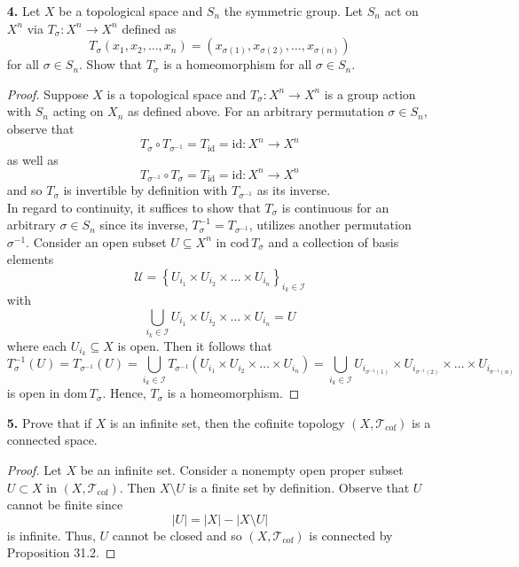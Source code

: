 \documentclass[ 12pt ]{article}
\begin{document}
\begin{enumerate}
	\item[\textbf{4.}] Let $X$ be a topological space and $S_n$ the symmetric group. Let $S_n$ act on $X^n$ via $T_\sigma : X^n \to X^n$ defined as $$T_\sigma(x_1, x_2, \hdots, x_n)
		= (x_{\sigma(1)}, x_{\sigma(2)}, \hdots, x_{\sigma(n)})$$ for all $\sigma \in S_n$. Show that $T_\sigma$ is a homeomorphism for all $\sigma \in S_n$.

		\begin{proof}
			Suppose $X$ is a topological space and $T_\sigma : X^n \to X^n$ is a group action with $S_n$ acting on $X_n$ as defined above. For an arbitrary permutation $\sigma \in S_n$,
			observe that $$T_\sigma \circ T_{\sigma^{-1}} = T_\mathrm{id} = \mathrm{id} : X^n \to X^n$$ as well as $$T_{\sigma^{-1}} \circ T_\sigma = T_\mathrm{id} = \mathrm{id} : X^n
			\to X^n$$ and so $T_\sigma$ is invertible by definition with $T_{\sigma^{-1}}$ as its inverse. \\

			In regard to continuity, it suffices to show that $T_\sigma$ is continuous for an arbitrary $\sigma \in S_n$ since its inverse, $T_\sigma^{-1} = T_{\sigma^{-1}}$, utilizes
			another permutation $\sigma^{-1}$. Consider an open subset $U \subseteq X^n$ in $\mathrm{cod}\, T_\sigma$ and a collection of basis elements $$\mathcal{U} = \left \{ U_{i_1}
			\times U_{i_2} \times \hdots \times U_{i_n} \right \}_{i_k \in \mathcal{I}}$$ with $$\bigcup_{i_k \in \mathcal{I}} U_{i_1} \times U_{i_2} \times \hdots \times U_{i_n} = U$$
			where each $U_{i_k} \subseteq X$ is open. Then it follows that $$T_\sigma^{-1}(U) = T_{\sigma^{-1}}(U) = \bigcup_{i_k \in \mathcal{I}} T_{\sigma^{-1}} \left ( U_{i_1} \times
			U_{i_2} \times \hdots \times U_{i_n} \right ) = \bigcup_{i_k \in \mathcal{I}} U_{i_{\sigma^{-1}(1)}} \times U_{i_{\sigma^{-1}(2)}} \times \hdots \times U_{i_{\sigma^{-1}
			(n)}}$$ is open in $\mathrm{dom}\, T_\sigma$. Hence, $T_\sigma$ is a homeomorphism.
		\end{proof}


	\item[\textbf{5.}] Prove that if $X$ is an infinite set, then the cofinite topology $(X, \mathcal{T}_\mathrm{cof})$ is a connected space.

		\begin{proof}
			Let $X$ be an infinite set. Consider a nonempty open proper subset $U \subset X$ in $(X, \mathcal{T}_\mathrm{cof})$. Then $X \setminus U$ is a finite set by definition.
			Observe that $U$ cannot be finite since $$|U| = |X| - |X \setminus U|$$ is infinite. Thus, $U$ cannot be closed and so $(X, \mathcal{T}_\mathrm{cof})$ is connected by
			Proposition 31.2.
		\end{proof}



\end{enumerate}
\end{document}
